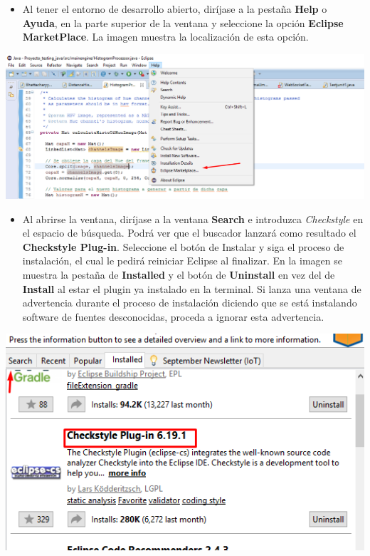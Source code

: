 \documentclass[a4paper]{article}
\begin{document}
{    
\begin{itemize}
\item Al tener el entorno de desarrollo abierto, diríjase a la pestaña \textbf{Help} o \textbf{Ayuda}, en la parte superior de la ventana y seleccione la opción \textbf{Eclipse MarketPlace}. La imagen muestra la localización de esta opción.
\end{itemize} 
\centering
\includegraphics[scale=0.5]{Screenshot_CheckStyle_1.png}
\justify
\begin{itemize}
\item Al abrirse la ventana, diríjase a la ventana \textbf{Search} e introduzca \textit{Checkstyle} en el espacio de búsqueda. Podrá ver que el buscador lanzará como resultado el \textbf{Checkstyle Plug-in}. Seleccione el botón de Instalar y siga el proceso de instalación, el cual le pedirá reiniciar Eclipse al finalizar. En la imagen se muestra la pestaña de \textbf{Installed} y el botón de \textbf{Uninstall} en vez del de \textbf{Install} al estar el plugin ya instalado en la terminal. Si lanza una ventana de advertencia durante el proceso de instalación diciendo que se está instalando software de fuentes desconocidas, proceda a ignorar esta advertencia. 
\end{itemize} 
\centering
\includegraphics[scale=0.5]{Screenshot_CheckStyle_2.png}
}
\end{document}
